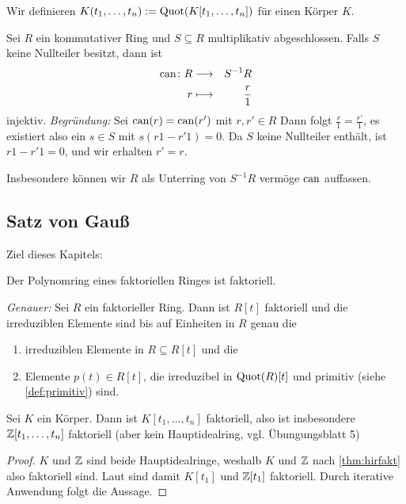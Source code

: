 \documentclass[12pt,a4paper]{scrartcl}
\begin{document}
Wir definieren $K(t_1,\dots,t_n) := \operatorname{Quot}(K[t_1,\dots,t_n])$ für einen Körper $K$.


\begin{bem}
	Sei $R$ ein kommutativer Ring und $S\subseteq R$ multiplikativ abgeschlossen. Falls $S$ keine Nullteiler besitzt, dann ist
	\begin{eqnarray*}
		 \operatorname{can}\colon R &\longrightarrow& S^{-1}R\\
		 r & \longmapsto& \frac r1
	\end{eqnarray*}
	injektiv. \emph{Begründung:} Sei $\operatorname{can}(r) = \operatorname{can}(r')$ mit $r,r'\in R$ Dann folgt $\frac r1 = \frac {r'}1$, es existiert also ein $ s\in S$ mit $ s(r1-r'1) = 0$. Da $S$ keine Nullteiler enthält, ist $r1 -r'1 = 0$, und wir erhalten $r' = r$.
	
	Insbesondere können wir $R$ als Unterring von $S^{-1}R$ vermöge $\operatorname{can}$ auffassen.
\end{bem}



\subsection{Satz von Gauß}
Ziel dieses Kapitels:
\begin{satz}\label{thm:gauss}
	Der Polynomring eines faktoriellen Ringes ist faktoriell.
	
	
	\emph{Genauer:} Sei $R$ ein faktorieller Ring. Dann ist $R[t]$ faktoriell und die irreduziblen Elemente sind bis auf Einheiten in $R$ genau die
	\begin{enumerate}[label=(\alph*)]
		\item irreduziblen Elemente in $R\subseteq R[t]$ und die \label{enumi:gauss:a}
		\item Elemente $p(t) \in R[t]$, die irreduzibel in $\operatorname{Quot}(R)[t]$ und primitiv \textup(siehe \cref{def:primitiv}\textup) sind. \label{enumi:gauss:b}
	\end{enumerate}
\end{satz}

\begin{kor}
	Sei $K$ ein Körper. Dann ist $K[t_1,\dots,t_n]$ faktoriell, also ist insbesondere $\mathbb Z[t_1,\dots, t_n]$ faktoriell \textup(aber kein Hauptidealring, vgl. Übungungsblatt 5\textup)
\end{kor}

\begin{proof} $K$ und $\mathbb Z$ sind beide Hauptidealringe, weshalb $K$ und $\mathbb Z$ nach \cref{thm:hirfakt} also faktoriell sind. Laut  sind damit $K[t_1]$ und $\mathbb Z[t_1]$ faktoriell. Durch iterative Anwendung folgt die Aussage.
\end{proof}
\end{document}
